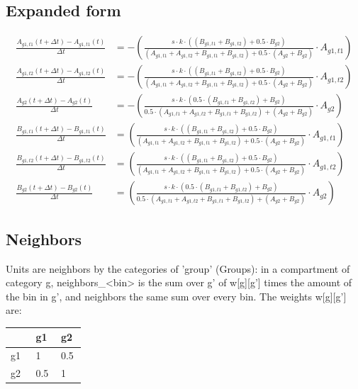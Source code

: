 \documentclass{article}
\begin{document}
\subsection*{Expanded form}
\begin{align*}
\frac{A_{g1,t1}(t+\Delta t) - A_{g1,t1}(t)}{\Delta t} &= - (\frac{s \cdot k \cdot ((B_{g1,t1} + B_{g1,t2}) + 0.5 \cdot B_{g2})}{(A_{g1,t1} + A_{g1,t2} + B_{g1,t1} + B_{g1,t2}) + 0.5 \cdot (A_{g2} + B_{g2})} \cdot A_{g1,t1}) \\
\frac{A_{g1,t2}(t+\Delta t) - A_{g1,t2}(t)}{\Delta t} &= - (\frac{s \cdot k \cdot ((B_{g1,t1} + B_{g1,t2}) + 0.5 \cdot B_{g2})}{(A_{g1,t1} + A_{g1,t2} + B_{g1,t1} + B_{g1,t2}) + 0.5 \cdot (A_{g2} + B_{g2})} \cdot A_{g1,t2}) \\
\frac{A_{g2}(t+\Delta t) - A_{g2}(t)}{\Delta t} &= - (\frac{s \cdot k \cdot (0.5 \cdot (B_{g1,t1} + B_{g1,t2}) + B_{g2})}{0.5 \cdot (A_{g1,t1} + A_{g1,t2} + B_{g1,t1} + B_{g1,t2}) + (A_{g2} + B_{g2})} \cdot A_{g2}) \\
\frac{B_{g1,t1}(t+\Delta t) - B_{g1,t1}(t)}{\Delta t} &= (\frac{s \cdot k \cdot ((B_{g1,t1} + B_{g1,t2}) + 0.5 \cdot B_{g2})}{(A_{g1,t1} + A_{g1,t2} + B_{g1,t1} + B_{g1,t2}) + 0.5 \cdot (A_{g2} + B_{g2})} \cdot A_{g1,t1}) \\
\frac{B_{g1,t2}(t+\Delta t) - B_{g1,t2}(t)}{\Delta t} &= (\frac{s \cdot k \cdot ((B_{g1,t1} + B_{g1,t2}) + 0.5 \cdot B_{g2})}{(A_{g1,t1} + A_{g1,t2} + B_{g1,t1} + B_{g1,t2}) + 0.5 \cdot (A_{g2} + B_{g2})} \cdot A_{g1,t2}) \\
\frac{B_{g2}(t+\Delta t) - B_{g2}(t)}{\Delta t} &= (\frac{s \cdot k \cdot (0.5 \cdot (B_{g1,t1} + B_{g1,t2}) + B_{g2})}{0.5 \cdot (A_{g1,t1} + A_{g1,t2} + B_{g1,t1} + B_{g1,t2}) + (A_{g2} + B_{g2})} \cdot A_{g2})
\end{align*}
\subsection*{Neighbors}
Units are neighbors by the categories of 'group' (Groups): in a compartment of category g, neighbors\_\textless{}bin\textgreater{} is the sum over g' of w[g][g'] times the amount of the bin in g', and neighbors the same sum over every bin. The weights w[g][g'] are:

\begin{longtable}{p{0.3\linewidth}p{0.3\linewidth}p{0.3\linewidth}}
 & g1 & g2 \\
\hline
\endhead
g1 & 1 & 0.5 \\
g2 & 0.5 & 1 \\
\end{longtable}
\end{document}
